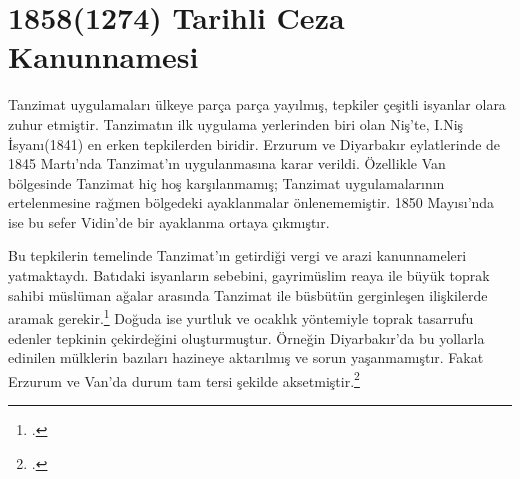 \section{1858(1274) Tarihli Ceza Kanunnamesi}
\indent\indent Tanzimat uygulamaları ülkeye parça parça yayılmış, tepkiler çeşitli isyanlar olara zuhur etmiştir. Tanzimatın ilk uygulama yerlerinden biri olan Niş'te, I.Niş İsyanı(1841) en erken tepkilerden biridir. 
Erzurum ve Diyarbakır eylatlerinde de 1845 Martı'nda Tanzimat'ın uygulanmasına karar verildi. Özellikle Van bölgesinde Tanzimat hiç hoş karşılanmamış; Tanzimat uygulamalarının ertelenmesine rağmen bölgedeki ayaklanmalar
önlenememiştir. 1850 Mayısı'nda ise bu sefer Vidin'de bir ayaklanma ortaya çıkmıştır.

Bu tepkilerin temelinde Tanzimat'ın getirdiği vergi ve arazi kanunnameleri yatmaktaydı. Batıdaki isyanların sebebini, gayrimüslim reaya ile büyük toprak sahibi müslüman ağalar arasında Tanzimat ile büsbütün gerginleşen ilişkilerde aramak gerekir.\footcite[193]{tanzimat}
Doğuda ise yurtluk ve ocaklık yöntemiyle toprak tasarrufu edenler tepkinin çekirdeğini oluşturmuştur. Örneğin Diyarbakır'da bu yollarla edinilen mülklerin bazıları hazineye aktarılmış ve sorun yaşanmamıştır. Fakat Erzurum ve Van'da durum tam tersi şekilde aksetmiştir.\footcite[203]{tanzimat}
 

